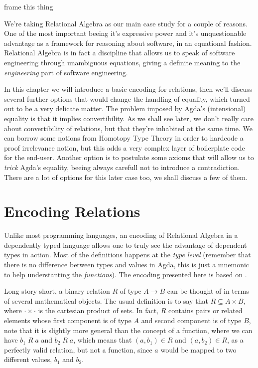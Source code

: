 \begin{TODO}
  \item frame this thing
\end{TODO}

We're taking Relational Algebra\cite{Bird97} as our main case study for a couple of reasons. One of the most
important beeing it's expressive power and it's unquestionable advantage as a framework for
reasoning about software, in an equational fashion. Relational Algebra is in fact a discipline that
allows us to speak of software engineering through unambiguous equations, giving a definite meaning
to the \emph{engineering} part of software engineering.

In this chapter we will introduce a basic encoding for relations, then we'll discuss several 
further options that would change the handling of equality, which turned out to be a very
delicate matter. The problem imposed by Agda's (intensional) equality is that it implies
convertibility. As we shall see later, we don't really care about convertibility of relations,
but that they're inhabited at the same time. We can borrow some notions from Homotopy Type Theory\cite{hottbook}
in order to hardcode a proof irrelevance notion, but this adds a very complex layer of boilerplate
code for the end-user. Another option is to postulate some axioms that will allow us to \emph{trick}
Agda's equality, beeing always carefull not to introduce a contradiction. 
There are a lot of options for this later case too, we shall discuss a few of them.

\section{Encoding Relations}

Unlike most programming languages, an encoding of Relational Algebra in a dependently typed 
language allows one to truly see the advantage of dependent types in action. Most of the definitions
happens at the \emph{type level} (remember that there is no difference between types and values in Agda,
this is just a mnemonic to help understanting the \emph{functions}). The encoding presented
here is based on \cite{Jansson09}.

Long story short, a binary relation $R$ of type $A \rightarrow B$ can be thought of in terms of several mathematical objects.
The usual definition is to say that $R \subseteq A \times B$, where $\cdot\times\cdot$ is the cartesian product of sets.
In fact, $R$ contains pairs or related elements whose first component is of type $A$ and second component is of type $B$,
note that it is slightly more general than the concept of a function, where we can have $b_1\;R\;a$ and $b_2\;R\;a$, which means
that $(a, b_1) \in R$ and $(a, b_2) \in R$, as a perfectly valid relation, but not a function, since $a$ would be mapped to two different values, $b_1$ and $b_2$.

